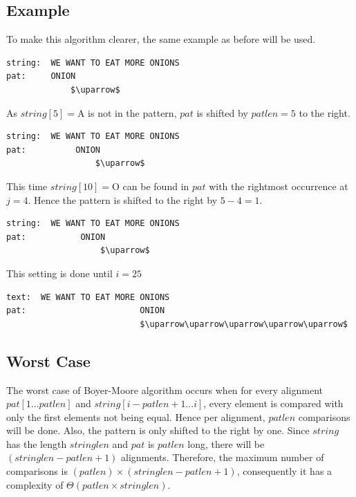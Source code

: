 \subsection{Example}
To make this algorithm clearer, the same example as before will be used.
\begin{lstlisting}[mathescape=true, basicstyle=\LSTfont]
string:  WE WANT TO EAT MORE ONIONS
pat:     ONION
             $\uparrow$
\end{lstlisting}

As $string[5]=$A is not in the pattern, $pat$ is shifted by $patlen=5$ to the right.

\begin{lstlisting}[mathescape=true, basicstyle=\LSTfont]
string:  WE WANT TO EAT MORE ONIONS
pat:          ONION
                  $\uparrow$
\end{lstlisting}

This time $string[10]=$O can be found in $pat$ with the rightmost occurrence at $j=4$. Hence the pattern is shifted to the right by $5-4=1$.

\begin{lstlisting}[mathescape=true, basicstyle=\LSTfont]
string:  WE WANT TO EAT MORE ONIONS
pat:           ONION
                   $\uparrow$
\end{lstlisting}

This setting is done until $i=25$

\begin{lstlisting}[mathescape=true, basicstyle=\LSTfont]
text:  WE WANT TO EAT MORE ONIONS
pat:                       ONION
                           $\uparrow\uparrow\uparrow\uparrow\uparrow$
\end{lstlisting}

\subsection{Worst Case}
The worst case of Boyer-Moore algorithm occurs when for every alignment $pat[1...patlen]$ and $string[i-patlen+1...i]$, every element is compared with only the first elements not being equal. Hence per alignment, $patlen$ comparisons will be done. Also, the pattern is only shifted to the right by one. Since $string$ has the length $stringlen$ and $pat$ is $patlen$ long, there will be $(stringlen-patlen+1)$ alignments. Therefore, the maximum number of comparisons is $(patlen)\times(stringlen-patlen+1)$, consequently it has a complexity of $\Theta\left(patlen \times stringlen\right)$.\cite{berry}


